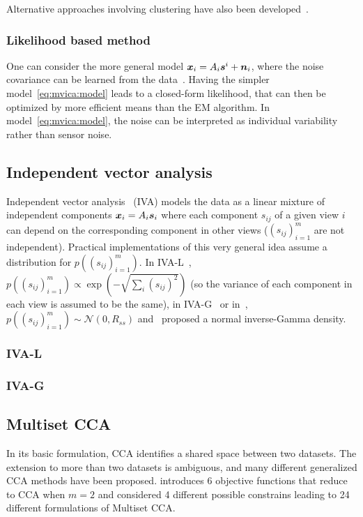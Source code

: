 % 
Alternative approaches involving clustering have also been developed~\cite{esposito2005independent,bigdely2013measure}.
\subsubsection{Likelihood based method}
\label{sec:guo}
One can consider the more general model $\boldsymbol{x}_i = A_i\boldsymbol{s}^i + \boldsymbol{n}_i$, where the noise covariance can be learned from the data~\cite{guo2008unified}.
% 
Having the simpler model~\eqref{eq:mvica:model} leads to a closed-form likelihood, that can then be optimized by more efficient means than the EM algorithm.
In model~\eqref{eq:mvica:model}, the noise can be interpreted as individual variability rather than sensor noise. %

\subsection{Independent vector analysis}
Independent vector analysis~\cite{lee2008independent} (IVA) models the data as a linear mixture of independent components $\boldsymbol{x}_i = A_i \boldsymbol{s}_i$ where each component $s_{ij}$ of a given view $i$ can depend on the corresponding component in other views ($(s_{ij})_{i=1}^m$ are not independent).
\label{sec:IVA}
Practical implementations of this very general idea assume a distribution for $p((s_{ij})_{i=1}^m)$. In IVA-L~\cite{lee2008independent}, $p((s_{ij})_{i=1}^m) \propto \exp(-\sqrt{\sum_i (s_{ij})^2})$ (so the variance of each component in each view is assumed to be the same), in IVA-G~\cite{anderson2011joint} or in~\cite{via2011maximum}, $p((s_{ij})_{i=1}^m) \sim \mathcal{N}(0, R_{ss})$ and~\cite{engberg2016independent} proposed a normal inverse-Gamma density.
\subsubsection{IVA-L}
\subsubsection{IVA-G}

\subsection{Multiset CCA}
\label{sec:mcca}
In its basic formulation, CCA identifies a shared space between two datasets.
The extension to more than two datasets is ambiguous, and many
different generalized CCA methods have been proposed. \cite{kettenring1971canonical} introduces 6 objective functions that reduce to CCA when $m=2$ and \cite{nielsen2002multiset} considered 4 different possible constrains leading to 24 different formulations of Multiset CCA.


